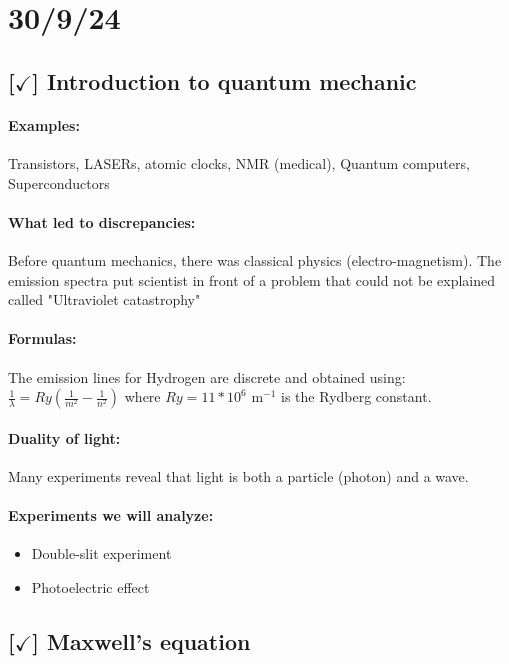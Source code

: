 \section{30/9/24}

\subsection{[$\checkmark$] Introduction to quantum mechanic}

\paragraph{Examples:} Transistors, LASERs, atomic clocks, NMR (medical), Quantum computers, Superconductors

\paragraph{What led to discrepancies:} Before quantum mechanics, there was classical physics (electro-magnetism). The emission spectra put scientist in front of a problem that could not be explained called "Ultraviolet catastrophy"

\paragraph{Formulas:} The emission lines for Hydrogen are discrete and obtained using: $\frac{1}{\lambda} = Ry \left( \frac{1}{m^2} - \frac{1}{n^2} \right)$ where $Ry = 11 * 10^6 \text{ m}^{-1}$ is the Rydberg constant.

\paragraph{Duality of light:} Many experiments reveal that light is both a particle (photon) and a wave.

\paragraph{Experiments we will analyze:} 
\begin{itemize}
	\item Double-slit experiment
	\item Photoelectric effect
\end{itemize}

\hrulefill

\subsection{[$\checkmark$] Maxwell's equation}

